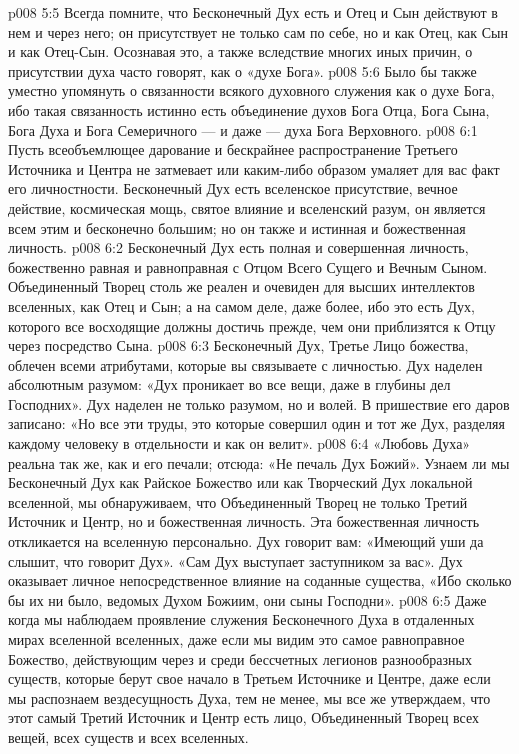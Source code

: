 \vs p008 5:5 Всегда помните, что Бесконечный Дух есть    и Отец и Сын действуют в нем и через него; он присутствует не только сам по себе, но и как Отец, как Сын и как Отец\hyp{}Сын. Осознавая это, а также вследствие многих иных причин, о присутствии духа часто говорят, как о «духе Бога».
\vs p008 5:6 Было бы также уместно упомянуть о связанности всякого духовного служения как о духе Бога, ибо такая связанность истинно есть объединение духов Бога Отца, Бога Сына, Бога Духа и Бога Семеричного --- и даже --- духа Бога Верховного.
\vs p008 6:1 Пусть всеобъемлющее дарование и бескрайнее распространение Третьего Источника и Центра не затмевает или каким\hyp{}либо образом умаляет для вас факт его личностности. Бесконечный Дух есть вселенское присутствие, вечное действие, космическая мощь, святое влияние и вселенский разум, он является всем этим и бесконечно большим; но он также и истинная и божественная личность.
\vs p008 6:2 Бесконечный Дух есть полная и совершенная личность, божественно равная и равноправная с Отцом Всего Сущего и Вечным Сыном. Объединенный Творец столь же реален и очевиден для высших интеллектов вселенных, как Отец и Сын; а на самом деле, даже более, ибо это есть Дух, которого все восходящие должны достичь прежде, чем они приблизятся к Отцу через посредство Сына.
\vs p008 6:3 Бесконечный Дух, Третье Лицо божества, облечен всеми атрибутами, которые вы связываете с личностью. Дух наделен абсолютным разумом: «Дух проникает во все вещи, даже в глубины дел Господних». Дух наделен не только разумом, но и волей. В пришествие его даров записано: «Но все эти труды, это которые совершил один и тот же Дух, разделяя каждому человеку в отдельности и как он велит».
\vs p008 6:4 «Любовь Духа» реальна так же, как и его печали; отсюда: «Не печаль Дух Божий». Узнаем ли мы Бесконечный Дух как Райское Божество или как Творческий Дух локальной вселенной, мы обнаруживаем, что Объединенный Творец не только Третий Источник и Центр, но и божественная личность. Эта божественная личность откликается на вселенную персонально. Дух говорит вам: «Имеющий уши да слышит, что говорит Дух». «Сам Дух выступает заступником за вас». Дух оказывает личное непосредственное влияние на соданные существа, «Ибо сколько бы их ни было, ведомых Духом Божиим, они сыны Господни».
\vs p008 6:5 Даже когда мы наблюдаем проявление служения Бесконечного Духа в отдаленных мирах вселенной вселенных, даже если мы видим это самое равноправное Божество, действующим через и среди бессчетных легионов разнообразных существ, которые берут свое начало в Третьем Источнике и Центре, даже если мы распознаем вездесущность Духа, тем не менее, мы все же утверждаем, что этот самый Третий Источник и Центр есть лицо, Объединенный Творец всех вещей, всех существ и всех вселенных.
